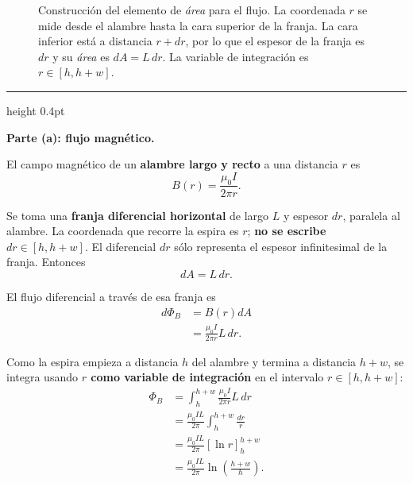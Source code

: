 \documentclass[11pt]{article}
\newcommand{\soluciontitulo}{%
  \par\medskip
  \noindent{\large\bfseries Solución.}\par
  \vspace{0.2em}\hrule height 0.4pt \vspace{0.7em}%
}
\newcommand{\paso}[1]{%
  \par\medskip
  \noindent\textbf{#1}\par
  \vspace{0.1em}%
}
\begin{document}
\begin{figure}[H]
\caption{Construcci\'on del elemento de \textit{\'area} para el flujo. La coordenada $r$ se mide desde el alambre hasta la cara superior de la franja. La cara inferior est\'a a distancia $r+dr$, por lo que el espesor de la franja es $dr$ y su \textit{\'area} es $dA=L\,dr$. La variable de integraci\'on es $r\in[h,h+w]$.}
\label{fig:p4_alambre}
\end{figure}





\soluciontitulo

\paso{Parte (a): flujo magn\'etico.}
El campo magn\'etico de un \textbf{alambre largo y recto} a una distancia $r$ es
\begin{equation*}
    B(r)=\frac{\mu_0 I}{2\pi r}.
\end{equation*}

Se toma una \textbf{franja diferencial horizontal} de largo $L$ y espesor $dr$, paralela al alambre. La coordenada que recorre la espira es $r$; \textbf{no se escribe $dr\in[h,h+w]$}. El diferencial $dr$ s\'olo representa el espesor infinitesimal de la franja. Entonces
\begin{equation*}
    dA=L\,dr.
\end{equation*}

El flujo diferencial a trav\'es de esa franja es
\begin{align*}
    d\Phi_B
    &=B(r)dA \\
    &=\frac{\mu_0 I}{2\pi r}L\,dr.
\end{align*}

Como la espira empieza a distancia $h$ del alambre y termina a distancia $h+w$, se integra usando \textbf{$r$ como variable de integraci\'on} en el intervalo \textbf{$r\in[h,h+w]$}:
\begin{align*}
    \Phi_B
    &=\int_h^{h+w}\frac{\mu_0 I}{2\pi r}L\,dr \\
    &=\frac{\mu_0 I L}{2\pi}\int_h^{h+w}\frac{dr}{r} \\
    &=\frac{\mu_0 I L}{2\pi}\left[\ln r\right]_h^{h+w} \\
    &=\frac{\mu_0 I L}{2\pi}\ln\left(\frac{h+w}{h}\right).
\end{align*}
\end{document}
